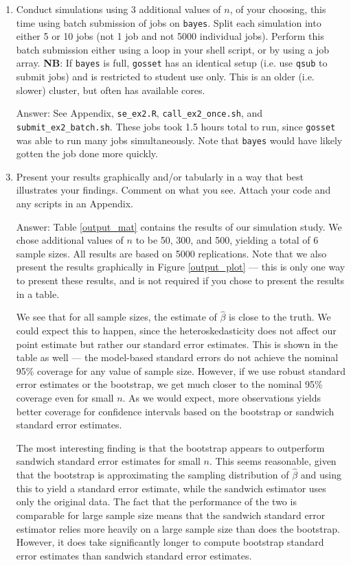 \documentclass{article}
\begin{document}
\begin{enumerate}
\item Conduct simulations using 3 additional values of $n$, of your choosing, this time using batch submission of jobs on \texttt{bayes}. Split each simulation into either 5 or 10 jobs (not 1 job and not 5000 individual jobs). Perform this batch submission either using a loop in your shell script, or by using a job array. \textbf{NB}: If \texttt{bayes} is full, \texttt{gosset} has an identical setup (i.e. use \texttt{qsub} to submit jobs) and is restricted to student use only. This is an older (i.e. slower) cluster, but often has available cores.

\item[Answer:] See Appendix, \texttt{se\_ex2.R}, \texttt{call\_ex2\_once.sh}, and \texttt{submit\_ex2\_batch.sh}. These jobs took 1.5 hours total to run, since \texttt{gosset} was able to run many jobs simultaneously. Note that \texttt{bayes} would have likely gotten the job done more quickly.

\item Present your results graphically and/or tabularly in a way that best illustrates your findings. Comment on what you see. Attach your code and any scripts in an Appendix.

\item[Answer:] Table \ref{output_mat} contains the results of our simulation study. We chose additional values of $n$ to be 50, 300, and 500, yielding a total of 6 sample sizes. All results are based on 5000 replications. Note that we also present the results graphically in Figure \ref{output_plot} --- this is only one way to present these results, and is not required if you chose to present the results in a table. 

We see that for all sample sizes, the estimate of $\hat{\beta}$ is close to the truth. We could expect this to happen, since the heteroskedasticity does not affect our point estimate but rather our standard error estimates. This is shown in the table as well --- the model-based standard errors do not achieve the nominal 95\% coverage for any value of sample size. However, if we use robust standard error estimates or the bootstrap, we get much closer to the nominal 95\% coverage even for small $n$. As we would expect, more observations yields better coverage for confidence intervals based on the bootstrap or sandwich standard error estimates. 

The most interesting finding is that the bootstrap appears to outperform sandwich standard error estimates for small $n$. This seems reasonable, given that the bootstrap is approximating the sampling distribution of $\hat{\beta}$ and using this to yield a standard error estimate, while the sandwich estimator uses only the original data. The fact that the performance of the two is comparable for large sample size means that the sandwich standard error estimator relies more heavily on a large sample size than does the bootstrap. However, it does take significantly longer to compute bootstrap standard error estimates than sandwich standard error estimates.


\end{enumerate}
\end{document}
